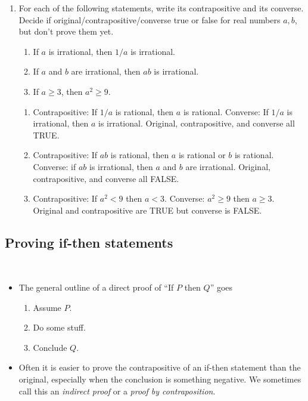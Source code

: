\documentclass[12pt]{amsart}
\numberwithin{equation}{section}
\theoremstyle{plain} %
\theoremstyle{definition}
\theoremstyle{remark}
\begin{document}
\begin{enumerate}
\item For each of the following statements, write its contrapositive and its converse. Decide if original/contrapositive/converse true or false for real numbers $a,b$, but don't prove them yet.
\begin{enumerate}
\item If $a$ is irrational, then $1/a$ is irrational.
\item If $a$ and $b$ are irrational, then $ab$ is irrational.
\item If $a\geq3$, then $a^2\geq 9$.
\end{enumerate}

\begin{framed}
\begin{enumerate}
\item Contrapositive: If $1/a$ is rational, then $a$ is rational. Converse: If $1/a$ is irrational, then $a$ is irrational. Original, contrapositive, and converse all TRUE.
\item Contrapositive: If $ab$ is rational, then $a$ is rational or $b$ is rational. Converse: if $ab$ is irrational, then $a$ and $b$ are irrational. Original, contrapositive, and converse all FALSE.
\item Contrapositive: If $a^2 < 9$  then $a<3$. Converse: $a^2 \geq 9$ then $a\geq 3$. Original and contrapositive are TRUE but converse is FALSE.\end{enumerate}
\end{framed}
\end{enumerate}





\subsection*{Proving if-then statements}

\

\begin{framed}
\begin{itemize}
\item The general outline of a direct proof of ``If $P$ then $Q$'' goes
\begin{enumerate}
\item Assume $P$.
\item Do some stuff.
\item Conclude $Q$.
\end{enumerate}
\item Often it is easier to prove the contrapositive of an if-then statement than the original, especially when the conclusion is something negative. We sometimes call this an \emph{indirect proof} or a \emph{proof by contraposition}.
\end{itemize}

\end{framed}
\end{document}
